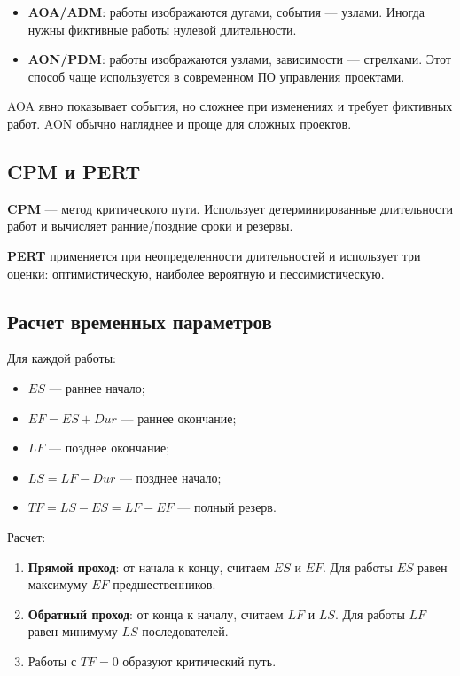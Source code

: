 \begin{itemize}
    \item \textbf{AOA/ADM}: работы изображаются дугами, события --- узлами. Иногда нужны фиктивные работы нулевой длительности.
    \item \textbf{AON/PDM}: работы изображаются узлами, зависимости --- стрелками. Этот способ чаще используется в современном ПО управления проектами.
\end{itemize}

AOA явно показывает события, но сложнее при изменениях и требует фиктивных работ. AON обычно нагляднее и проще для сложных проектов.

\subsection*{CPM и PERT}

\textbf{CPM} --- метод критического пути. Использует детерминированные длительности работ и вычисляет ранние/поздние сроки и резервы.

\textbf{PERT} применяется при неопределенности длительностей и использует три оценки: оптимистическую, наиболее вероятную и пессимистическую.

\subsection*{Расчет временных параметров}

Для каждой работы:
\begin{itemize}
    \item $ES$ --- раннее начало;
    \item $EF=ES+Dur$ --- раннее окончание;
    \item $LF$ --- позднее окончание;
    \item $LS=LF-Dur$ --- позднее начало;
    \item $TF=LS-ES=LF-EF$ --- полный резерв.
\end{itemize}

Расчет:
\begin{enumerate}
    \item \textbf{Прямой проход}: от начала к концу, считаем $ES$ и $EF$. Для работы $ES$ равен максимуму $EF$ предшественников.
    \item \textbf{Обратный проход}: от конца к началу, считаем $LF$ и $LS$. Для работы $LF$ равен минимуму $LS$ последователей.
    \item Работы с $TF=0$ образуют критический путь.
\end{enumerate}

